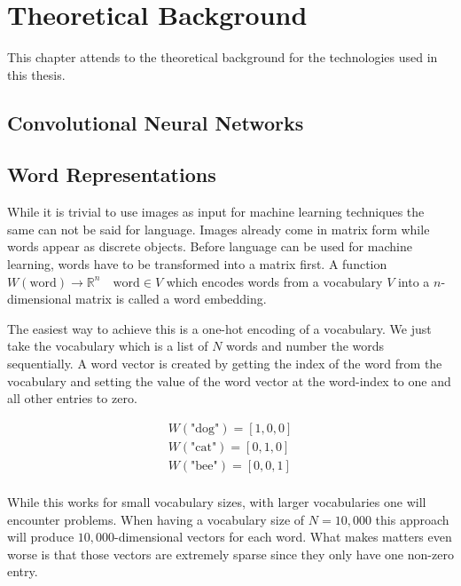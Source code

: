 \chapter{Theoretical Background}
\label{ch:theory}

This chapter attends to the theoretical background for the technologies used in this thesis.

\section{Convolutional Neural Networks}

\section{Word Representations}

While it is trivial to use images as input for machine learning techniques the same can not be said for language. Images already come in matrix form while words appear as discrete objects. Before language can be used for machine learning, words have to be transformed into a matrix first. A function $W(\text{word}) \rightarrow \mathbb{R}^n \quad \text{word} \in V$  which encodes words from a vocabulary $V$ into a $n$-dimensional matrix is called a word embedding.
\medskip

The easiest way to achieve this is a one-hot encoding of a vocabulary. We just take the vocabulary which is a list of $N$ words and number the words sequentially. A word vector is created by getting the index of the word from the vocabulary and setting the value of the word vector at the word-index to one and all other entries to zero.

\begin{equation*}
	\begin{aligned}
		W(\text{"dog"}) = [1, 0, 0] \\
		W(\text{"cat"}) = [0, 1, 0] \\
		W(\text{"bee"}) = [0, 0, 1] \\
	\end{aligned}
\end{equation*}


While this works for small vocabulary sizes, with larger vocabularies one will encounter problems. When having a vocabulary size of $N=10,000$ this approach will produce $10,000$-dimensional vectors for each word. What makes matters even worse is that those vectors are extremely sparse since they only have one non-zero entry.
\medskip

